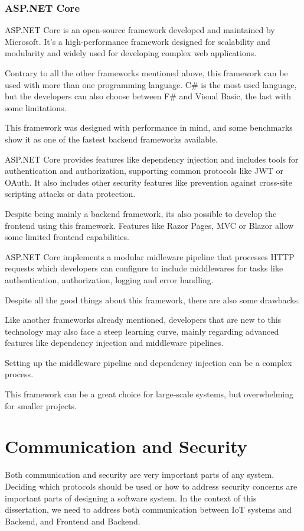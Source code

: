 \subsubsection{ASP.NET Core}
ASP.NET Core is an open-source framework developed and maintained by Microsoft.
It's a high-performance framework designed for scalability and modularity and
widely used for developing complex web applications\cite{ASPMicrosoft}.

Contrary to all the other frameworks mentioned above, this framework can be
used with more than one programming language. C\# is the most used language, but
the developers can also choose between F\# and Visual Basic, the last with some
limitations.

This framework was designed with performance in mind, and some benchmarks show
it as one of the fastest backend frameworks available.

ASP.NET Core provides features like dependency injection and includes tools for
authentication and authorization, supporting common protocols like \gls{JWT} or OAuth.
It also includes other security features like prevention against cross-site
scripting attacks or data protection\cite{ASPMicrosoft}.

Despite being mainly a backend framework, its also possible to develop the
frontend using this framework. Features like Razor Pages, \gls{MVC} or Blazor allow
some limited frontend capabilities\cite{ASPMicrosoft}.

ASP.NET Core implements a modular midleware pipeline that processes \gls{HTTP}
requests which developers can configure to include middlewares for tasks like
authentication, authorization, logging and error handling.

Despite all the good things about this framework, there are also some drawbacks.

Like another frameworks already mentioned, developers that are new to this
technology may also face a steep learning curve, mainly regarding advanced
features like dependency injection and middleware pipelines.

Setting up the middleware pipeline and dependency injection can be a complex
process.

This framework can be a great choice for large-scale systems, but overwhelming
for smaller projects.

\section{Communication and Security}
Both communication and security are very important parts of any system.
Deciding which protocols should be used or how to address security concerns are
important parts of designing a software system. In the context of this
dissertation, we need to address both communication between \gls{IoT} systems and
Backend, and Frontend and Backend.


